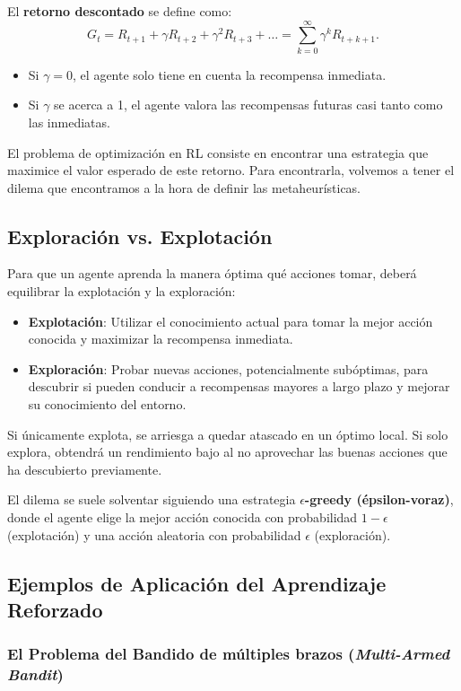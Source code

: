 \documentclass[12pt,a4paper]{book}
\begin{document}
El \textbf{retorno descontado} se define como:
\[ G_t = R_{t+1} + \gamma R_{t+2} + \gamma^2 R_{t+3} + \dots = \sum_{k=0}^{\infty} \gamma^k R_{t+k+1} .\]

\begin{itemize}
    \item Si $\gamma = 0$, el agente solo tiene en cuenta la recompensa inmediata.
    \item Si $\gamma$ se acerca a 1, el agente valora las recompensas futuras casi tanto como las inmediatas.
\end{itemize}

El problema de optimización en RL consiste en encontrar una estrategia que maximice el valor esperado de este retorno. Para encontrarla, volvemos a tener el dilema que encontramos a la 
hora de definir las metaheurísticas.

\subsection{Exploración vs. Explotación}

Para que un agente aprenda la manera  óptima qué acciones tomar, deberá equilibrar la explotación y la exploración:
\begin{itemize}
    \item \textbf{Explotación}: Utilizar el conocimiento actual para tomar la mejor acción conocida y maximizar la recompensa inmediata.
    \item \textbf{Exploración}: Probar nuevas acciones, potencialmente subóptimas, para descubrir si pueden conducir a recompensas mayores a largo plazo y mejorar su conocimiento del entorno.
\end{itemize}
Si únicamente explota, se arriesga a quedar atascado en un óptimo local.
Si solo explora, obtendrá un rendimiento bajo al no aprovechar las buenas acciones que ha descubierto previamente.

El dilema se suele solventar siguiendo una estrategia \textbf{$\epsilon$-greedy (épsilon-voraz)}, donde el agente elige la mejor acción conocida con probabilidad $1-\epsilon$ (explotación) y una acción aleatoria con probabilidad $\epsilon$ (exploración).

\subsection{Ejemplos de Aplicación del Aprendizaje Reforzado}

\subsubsection{El Problema del Bandido de múltiples brazos (\textit{Multi-Armed Bandit})}
\end{document}
